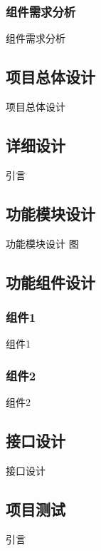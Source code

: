 \documentclass[twoside]{CUGThesis}
\begin{document}
		\subsubsection{组件需求分析}
		组件需求分析
	\subsection{项目总体设计}
	项目总体设计

\begin{spacing}{2}
	\section{详细设计}
\end{spacing}
引言
	\subsection{功能模块设计}
	功能模块设计
	图
	\subsection{功能组件设计}
		\subsubsection{组件1}
		组件1
		\subsubsection{组件2}
		组件2
	\subsection{接口设计}
	接口设计

\begin{spacing}{2}
	\section{项目测试}
\end{spacing}
引言
\end{document}
